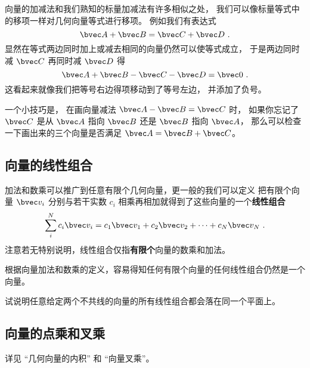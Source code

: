 向量的加减法和我们熟知的标量加减法有许多相似之处， 我们可以像标量等式中的移项一样对几何向量等式进行移项。 例如我们有表达式
\begin{equation}
\bvec A + \bvec B = \bvec C + \bvec D~.
\end{equation}
显然在等式两边同时加上或减去相同的向量仍然可以使等式成立， 于是两边同时减 $\bvec C$ 再同时减 $\bvec D$ 得
\begin{equation}
\bvec A + \bvec B - \bvec C - \bvec D = \bvec 0~.
\end{equation}
这看起来就像我们把等号右边得项移动到了等号左边， 并添加了负号。

一个小技巧是， 在画向量减法 $\bvec A - \bvec B = \bvec C$ 时， 如果你忘记了 $\bvec C$ 是从 $\bvec A$ 指向 $\bvec B$ 还是 $\bvec B$ 指向 $\bvec A$， 那么可以检查一下画出来的三个向量是否满足 $\bvec A = \bvec B + \bvec C$。


\subsection{向量的线性组合}

加法和数乘可以推广到任意有限个几何向量，更一般的我们可以定义
把有限个向量 $\bvec v_i$ 分别与若干实数 $c_i$ 相乘再相加就得到了这些向量的一个\textbf{线性组合}
\begin{equation}\label{eq_GVecOp_1}
\sum_i^N c_i \bvec v_i = c_1\bvec v_1 + c_2\bvec v_2 +\dots +c_N \bvec v_N~.
\end{equation}
注意若无特别说明，线性组合仅指\textbf{有限个}向量的数乘和加法。

根据向量加法和数乘的定义，容易得知任何有限个向量的任何线性组合仍然是一个向量。

\begin{exercise}{}
试说明任意给定两个不共线的向量的所有线性组合都会落在同一个平面上。
\end{exercise}

\subsection{向量的点乘和叉乘}
详见 “几何向量的内积” 和 “向量叉乘”。
